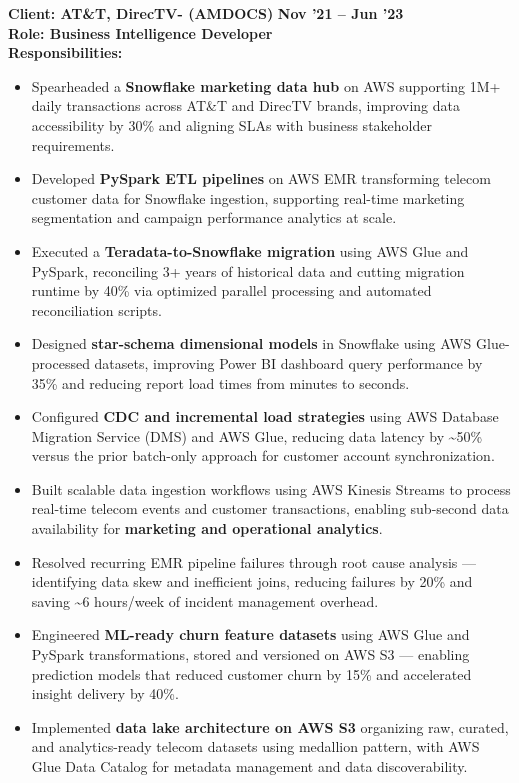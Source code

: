 \documentclass[a4paper,10pt]{article}
\begin{document}
\vspace{0.5cm}
\textbf{Client: AT\&T, DirecTV- (AMDOCS)} \hfill \textbf{Nov '21 – Jun '23} \\
\textbf{Role: Business Intelligence Developer} \\
\textbf{Responsibilities:}
\begin{itemize}
    \item Spearheaded a \textbf{Snowflake marketing data hub} on AWS supporting 1M+ daily transactions across AT\&T and DirecTV brands, improving data accessibility by 30\% and aligning SLAs with business stakeholder requirements.
    \item Developed \textbf{PySpark ETL pipelines} on AWS EMR transforming telecom customer data for Snowflake ingestion, supporting real-time marketing segmentation and campaign performance analytics at scale.
    \item Executed a \textbf{Teradata-to-Snowflake migration} using AWS Glue and PySpark, reconciling 3+ years of historical data and cutting migration runtime by 40\% via optimized parallel processing and automated reconciliation scripts.
    \item Designed \textbf{star-schema dimensional models} in Snowflake using AWS Glue-processed datasets, improving Power BI dashboard query performance by 35\% and reducing report load times from minutes to seconds.
    \item Configured \textbf{CDC and incremental load strategies} using AWS Database Migration Service (DMS) and AWS Glue, reducing data latency by \textasciitilde 50\% versus the prior batch-only approach for customer account synchronization.
    \item Built scalable data ingestion workflows using AWS Kinesis Streams to process real-time telecom events and customer transactions, enabling sub-second data availability for \textbf{marketing and operational analytics}.
    \item Resolved recurring EMR pipeline failures through root cause analysis — identifying data skew and inefficient joins, reducing failures by 20\% and saving \textasciitilde 6 hours/week of incident management overhead.
    \item Engineered \textbf{ML-ready churn feature datasets} using AWS Glue and PySpark transformations, stored and versioned on AWS S3 — enabling prediction models that reduced customer churn by 15\% and accelerated insight delivery by 40\%.
    \item Implemented \textbf{data lake architecture on AWS S3} organizing raw, curated, and analytics-ready telecom datasets using medallion pattern, with AWS Glue Data Catalog for metadata management and data discoverability.
\end{itemize}
\end{document}
